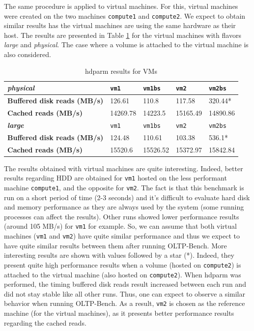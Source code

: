 The same procedure is applied to virtual machines.
For this, virtual machines were created on the two machines \texttt{compute1} and \texttt{compute2}.
We expect to obtain similar results has the virtual machines are using the same hardware as their host.
The results are presented in Table \ref{table:hdparm_res_VM} for the virtual machines with flavors \textit{large} and \textit{physical}. The case where a volume is attached to the virtual machine is also considered.

\begin{table}[h]
	\centering
	\begin{tabular}{|m{6.5cm}|m{1.5cm}|m{1.5cm}|m{1.5cm}|m{1.5cm}|}
		\hline
		\textbf{\textit{physical}} & 
		\texttt{vm1} & 
		\texttt{vm1bs} & 
		\texttt{vm2} & 
		\texttt{vm2bs} \\
		\hline
		\textbf{Buffered disk reads (MB/s)} & 
		126.61 & 
		110.8 & 
		117.58 & 
		320.44* \\
		\hline
		\textbf{Cached reads (MB/s)} &  
		14269.78 & 
		14223.5 & 
		15165.49 & 
		14890.86 \\
		\hline\hline
		\textbf{\textit{large}} & 
		\texttt{vm1} & 
		\texttt{vm1bs} & 
		\texttt{vm2} & 
		\texttt{vm2bs} \\
		\hline
		\textbf{Buffered disk reads (MB/s)} & 
		124.48 & 
		110.61 & 
		103.38 & 
		536.1* \\
		\hline
		\textbf{Cached reads (MB/s)} &  
		15520.6 & 
		15526.52 & 
		15372.97 & 
		15842.84 \\
		\hline
	\end{tabular}
	\caption{hdparm results for VMs}
	\label{table:hdparm_res_VM}
\end{table}

The results obtained with virtual machines are quite interesting.
Indeed, better results regarding HDD are obtained for \texttt{vm1} hosted on the less performant machine \texttt{compute1}, and the opposite for \texttt{vm2}.
The fact is that this benchmark is run on a short period of time (2-3 seconds) and 
it's difficult to evaluate hard disk and memory performance as they are always used by the system (some running processes can affect the results). 
Other runs showed lower performance results (around 105 MB/s) for \texttt{vm1} for example.
So, we can assume that both virtual machines (\texttt{vm1} and \texttt{vm2}) have quite similar performance and thus we expect to have quite similar results between them after running OLTP-Bench.
More interesting results are shown with values followed by a star (*). 
Indeed, they present quite high performance results when a volume (hosted on \texttt{compute2}) is attached to the virtual machine (also hosted on \texttt{compute2}).
When hdparm was performed, the timing buffered disk reads result increased between each run and did not stay stable like all other runs.
Thus, one can expect to observe a similar behavior when running OLTP-Bench.
As a result, \texttt{vm2} is chosen as the reference machine (for the virtual machines), as it presents better performance results regarding the cached reads.


